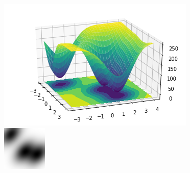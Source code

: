 \documentclass[11pt,twocolumn]{article} %
\begin{document}
\begin{figure}
  \begin{multicols}{3}
    \includegraphics[width=\columnwidth]{./images/algorithm/generated.png}

    \includegraphics[width=\columnwidth]{./images/algorithm/test_img.png}


\end{multicols}
\end{figure}
\end{document}
